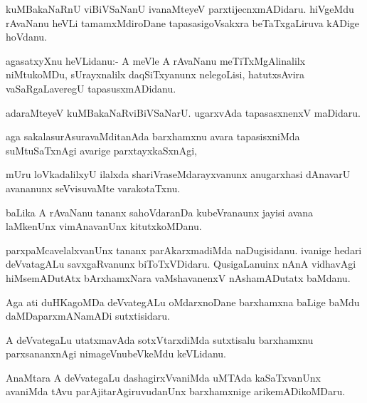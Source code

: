 \documentclass{article}
\begin{document}
\begin{mn}%
kuMBakaNaRnU viBiVSaNanU ivanaMteyeV parxtijecnxmADidaru. hiVgeMdu rAvaNanu heVLi 
tamamxMdiroDane tapasasigoVsakxra beTaTxgaLiruva kADige hoVdanu.
\end{mn}



\begin{mn}%
agasatxyXnu heVLidanu:- A meVle A rAvaNanu meTiTxMgAlinalilx niMtukoMDu, sUrayxnalilx 
daqSiTxyanunx nelegoLisi, hatutxsAvira vaSaRgaLaveregU tapasusxmADidanu.
\end{mn}

\begin{mn}%
adaraMteyeV kuMBakaNaRviBiVSaNarU. ugarxvAda tapasasxnenxV maDidaru.
\end{mn}

\begin{mn}%
aga sakalasurAsuravaMditanAda barxhamxnu avara tapasisxniMda suMtuSaTxnAgi avarige 
parxtayxkaSxnAgi,
\end{mn}

\begin{mn}%
mUru loVkadalilxyU ilalxda shariVraseMdarayxvanunx anugarxhasi dAnavarU avananunx 
seVvisuvaMte varakotaTxnu.
\end{mn}

\begin{mn}%
baLika A rAvaNanu tananx sahoVdaranDa kubeVranaunx jayisi avana laMkenUnx vimAnavanUnx 
kitutxkoMDanu.
\end{mn}

\begin{mn}%
parxpaMcavelalxvanUnx tananx parAkarxmadiMda naDugisidanu. ivanige hedari deVvatagALu 
savxgaRvanunx biToTxVDidaru. QusigaLanuinx nAnA vidhavAgi hiMsemADutAtx bArxhamxNara 
vaMshavanenxV nAshamADutatx baMdanu.
\end{mn}

\begin{mn}%
Aga ati duHKagoMDa deVvategALu oMdarxnoDane barxhamxna baLige baMdu daMDaparxmANamADi 
sutxtisidaru.
\end{mn}

\begin{mn}%
A deVvategaLu utatxmavAda sotxVtarxdiMda sutxtisalu barxhamxnu parxsananxnAgi 
nimageVnubeVkeMdu keVLidanu.
\end{mn}

\begin{mn}%
AnaMtara A deVvategaLu dashagirxVvaniMda uMTAda kaSaTxvanUnx avaniMda tAvu 
parAjitarAgiruvudanUnx barxhamxnige arikemADikoMDaru.
\end{mn}
\end{document}

